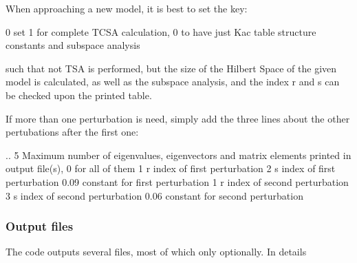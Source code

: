 When approaching a new model, it is best to set the key\+: \begin{DoxyVerb}0    set 1 for complete TCSA calculation, 0 to have just Kac table structure constants and subspace analysis
\end{DoxyVerb}


such that not {\ttfamily T\+SA} is performed, but the size of the Hilbert Space of the given model is calculated, as well as the subspace analysis, and the index r and s can be checked upon the printed table.

If more than one perturbation is need, simply add the three lines about the other pertubations after the first one\+: \begin{DoxyVerb}..
5   Maximum number of eigenvalues, eigenvectors and matrix elements printed in output file(s), 0 for all of them
1    r index of first perturbation
2    s index of first perturbation
0.09  constant for first perturbation
1    r index of second perturbation
3    s index of second perturbation
0.06  constant for second perturbation
\end{DoxyVerb}


\subsubsection*{Output files}

The code outputs several files, most of which only optionally. In details



